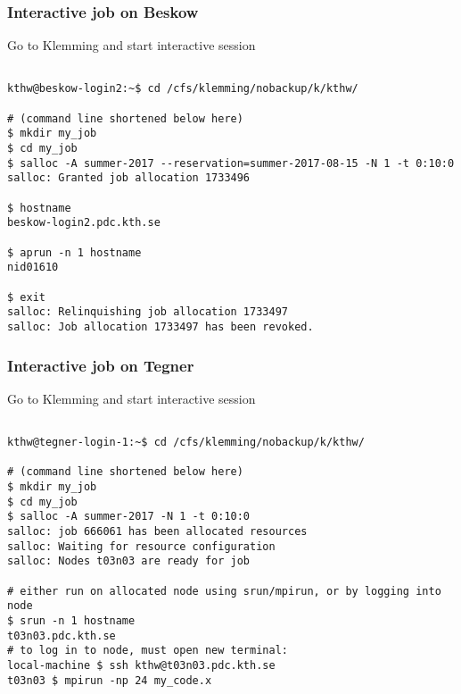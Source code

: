 \begin{frame}[fragile]
  \frametitle{Interactive job on Beskow}
  \begin{alertblock}{Go to Klemming and start interactive session}
    \verbatimfont{\footnotesize}
    \begin{verbatim}

kthw@beskow-login2:~$ cd /cfs/klemming/nobackup/k/kthw/

# (command line shortened below here)
$ mkdir my_job
$ cd my_job
$ salloc -A summer-2017 --reservation=summer-2017-08-15 -N 1 -t 0:10:0
salloc: Granted job allocation 1733496

$ hostname
beskow-login2.pdc.kth.se

$ aprun -n 1 hostname
nid01610

$ exit
salloc: Relinquishing job allocation 1733497
salloc: Job allocation 1733497 has been revoked.

 \end{verbatim}
\end{alertblock}



\end{frame}



\begin{frame}[fragile]
  \frametitle{Interactive job on Tegner}
  \begin{alertblock}{Go to Klemming and start interactive session}
    \verbatimfont{\footnotesize}
    \begin{verbatim}

kthw@tegner-login-1:~$ cd /cfs/klemming/nobackup/k/kthw/

# (command line shortened below here)
$ mkdir my_job
$ cd my_job
$ salloc -A summer-2017 -N 1 -t 0:10:0
salloc: job 666061 has been allocated resources
salloc: Waiting for resource configuration
salloc: Nodes t03n03 are ready for job

# either run on allocated node using srun/mpirun, or by logging into node
$ srun -n 1 hostname
t03n03.pdc.kth.se
# to log in to node, must open new terminal:
local-machine $ ssh kthw@t03n03.pdc.kth.se
t03n03 $ mpirun -np 24 my_code.x

 \end{verbatim}
\end{alertblock}



\end{frame}


